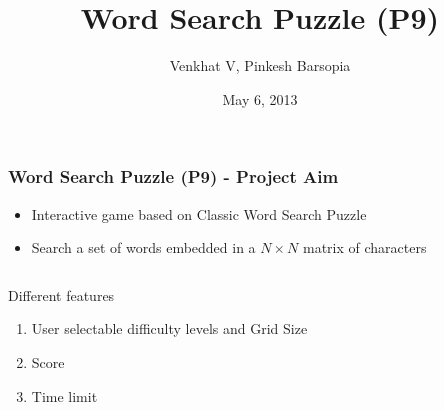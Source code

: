 \documentclass{beamer}
\begin{document}
\title{Word Search Puzzle (P9)}  
\author{Venkhat V, Pinkesh Barsopia}
\date{May 6, 2013} 





\begin{frame}\frametitle{Word Search Puzzle (P9) - Project Aim }
\begin{itemize}
 \item Interactive game based on Classic Word Search Puzzle
\item Search a set of words embedded in a $N \times N$ matrix of characters

\end{itemize}
\begin{columns}[c]
\begin{column}{5cm}
Different features
\begin{enumerate}
\item User selectable difficulty levels and Grid Size
\item Score
\item Time limit
\end{enumerate}
\end{column}
\begin{column}{5cm}


\end{column}
\end{columns}
\end{frame}
\end{document}
